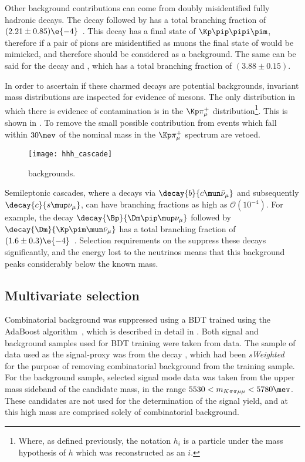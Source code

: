 Other background contributions can come from doubly misidentified fully hadronic decays.
The decay \decay{\Bd}{\Dzb\pip\pipi} followed by \decay{\Dzb}{\kpi}
has a total branching fraction of $(2.21\pm0.85)\e{-4}$~\cite{PDG2012}.
This decay has a final state of $\Kp\pip\pipi\pim$, therefore if a pair of pions are misidentified
as muons the final state of \kpipimumu would be mimicked, and therefore should be considered as a
background.
The same can be said for the decay \decay{\Bd}{\Dzb\pip} and \decay{\Dzb}{\Km\pip\pipi},
which has a total branching fraction of $(3.88\pm0.15)$.

In order to ascertain if these charmed decays are potential backgrounds, invariant mass
distributions are inspected for evidence of \Dz mesons.
The only distribution in which there is evidence of contamination is in the
$\Kp\pi^+_\mu$ distribution\footnote{
  Where, as defined previously, the notation $h_i$ is a particle under the mass hypothesis of $h$
  which was reconstructed as an $i$.
}.
This is shown in .
To remove the small possible contribution from \decay{\Bd}{\Dzb\pip\pipi} events which fall within
$30\mev$ of the nominal \Dz mass in the $\Kp\pi^+_\mu$ spectrum are vetoed.

\begin{figure}
  \begin{center}
    \texttt{[image: hhh\_cascade]}
    \caption{\small
      \Dz backgrounds.
    }
    \label{fig:hhh:dzbkg}
  \end{center}
\end{figure}

Semileptonic cascades, where a \bquark decays via $\decay{b}{c\mun\bar\nu_\mu}$ and subsequently
$\decay{c}{s\mup\nu_\mu}$, can have branching fractions as high as $\mathcal{O}(10^{-4})$.
For example, the decay $\decay{\Bp}{\Dm\pip\mup\nu_\mu}$ followed by
$\decay{\Dm}{\Kp\pim\mun\bar\nu_\mu}$ has a total branching fraction of
$(1.6\pm0.3)\e{-4}$~\cite{PDG2014}.
Selection requirements on the \chisqvtx suppress these decays significantly, and the energy lost to
the neutrinos means that this background peaks considerably below the known \Bp mass.




\subsection{Multivariate selection}
\label{sec:hhh:bdt}
Combinatorial background was suppressed using a BDT trained using the AdaBoost
algorithm~\cite{AdaBoost}, which is described in detail in .
Both signal and background samples used for BDT training were taken from data.
The sample of data used as the signal-proxy was from  the decay \btojpsikpipi, which had been
\emph{sWeighted}~\cite{splot} for the purpose of removing combinatorial background from the
training sample.
For the background sample, selected signal mode data was taken from the upper mass sideband of the
\Bp candidate mass, in the range $5530<m_{K\pi\pi\mu\mu}<5780\mev$.
These candidates are not used for the determination of the signal yield, and at this high mass are
comprised solely of combinatorial background.

